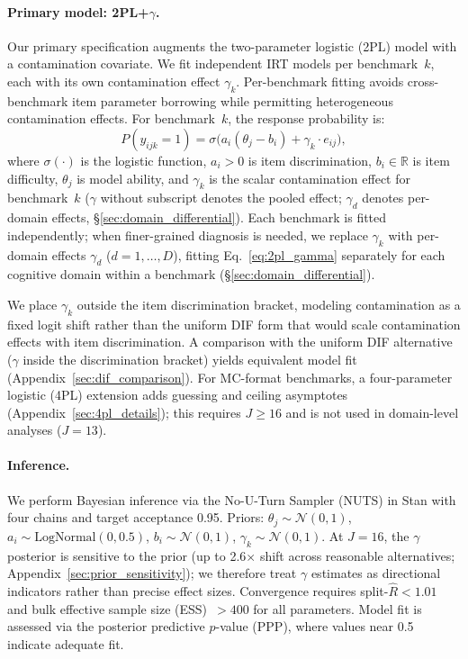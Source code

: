 \paragraph{Primary model: 2PL+$\gamma$.}
Our primary specification augments the two-parameter logistic (2PL) model \citep{lord_1980_irt,hambleton_1991_irt} with a contamination covariate. We fit independent IRT models per benchmark~$k$, each with its own contamination effect $\gamma_k$. Per-benchmark fitting avoids cross-benchmark item parameter borrowing while permitting heterogeneous contamination effects. For benchmark~$k$, the response probability is:
\begin{equation}
\label{eq:2pl_gamma}
    P(y_{ijk} = 1) = \sigma\!\bigl(a_i(\theta_j - b_i) + \gamma_k \cdot e_{ij}\bigr),
\end{equation}
where $\sigma(\cdot)$ is the logistic function, $a_i > 0$ is item discrimination, $b_i \in \mathbb{R}$ is item difficulty, $\theta_j$ is model ability, and $\gamma_k$ is the scalar contamination effect for benchmark~$k$ ($\gamma$ without subscript denotes the pooled effect; $\gamma_d$ denotes per-domain effects, \S\ref{sec:domain_differential}). Each benchmark is fitted independently; when finer-grained diagnosis is needed, we replace $\gamma_k$ with per-domain effects $\gamma_d$ ($d=1,\ldots,D$), fitting Eq.~\eqref{eq:2pl_gamma} separately for each cognitive domain within a benchmark (\S\ref{sec:domain_differential}).

We place $\gamma_k$ outside the item discrimination bracket, modeling contamination as a fixed logit shift \citep{de_ayala_2009_irt} rather than the uniform DIF form that would scale contamination effects with item discrimination. A comparison with the uniform DIF alternative ($\gamma$ inside the discrimination bracket) yields equivalent model fit (Appendix~\ref{sec:dif_comparison}). For MC-format benchmarks, a four-parameter logistic (4PL) extension adds guessing and ceiling asymptotes (Appendix~\ref{sec:4pl_details}); this requires $J \geq 16$ and is not used in domain-level analyses ($J = 13$).

\paragraph{Inference.}
We perform Bayesian inference via the No-U-Turn Sampler (NUTS) \citep{hoffman2014} in Stan \citep{carpenter2017} with four chains and target acceptance 0.95. Priors: $\theta_j \sim \mathcal{N}(0,1)$, $a_i \sim \text{LogNormal}(0, 0.5)$, $b_i \sim \mathcal{N}(0,1)$, $\gamma_k \sim \mathcal{N}(0,1)$. At $J=16$, the $\gamma$ posterior is sensitive to the prior (up to 2.6$\times$ shift across reasonable alternatives; Appendix~\ref{sec:prior_sensitivity}); we therefore treat $\gamma$ estimates as directional indicators rather than precise effect sizes. Convergence requires split-$\hat{R} < 1.01$ and bulk effective sample size (ESS)~$> 400$ for all parameters. Model fit is assessed via the posterior predictive $p$-value (PPP), where values near 0.5 indicate adequate fit.

